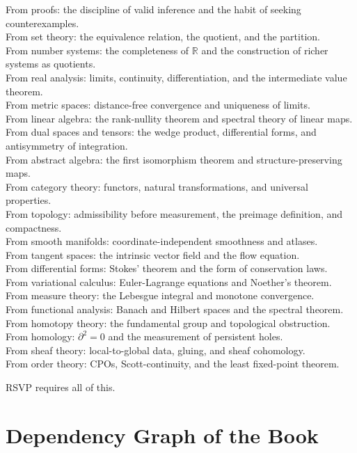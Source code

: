 \documentclass[12pt, twoside, openright, a4paper]{book}
\newcommand{\R}{\mathbb{R}}
\begin{document}
\noindent From proofs: the discipline of valid inference and the habit of seeking counterexamples.\\
From set theory: the equivalence relation, the quotient, and the partition.\\
From number systems: the completeness of $\R$ and the construction of richer systems as quotients.\\
From real analysis: limits, continuity, differentiation, and the intermediate value theorem.\\
From metric spaces: distance-free convergence and uniqueness of limits.\\
From linear algebra: the rank-nullity theorem and spectral theory of linear maps.\\
From dual spaces and tensors: the wedge product, differential forms, and antisymmetry of integration.\\
From abstract algebra: the first isomorphism theorem and structure-preserving maps.\\
From category theory: functors, natural transformations, and universal properties.\\
From topology: admissibility before measurement, the preimage definition, and compactness.\\
From smooth manifolds: coordinate-independent smoothness and atlases.\\
From tangent spaces: the intrinsic vector field and the flow equation.\\
From differential forms: Stokes' theorem and the form of conservation laws.\\
From variational calculus: Euler-Lagrange equations and Noether's theorem.\\
From measure theory: the Lebesgue integral and monotone convergence.\\
From functional analysis: Banach and Hilbert spaces and the spectral theorem.\\
From homotopy theory: the fundamental group and topological obstruction.\\
From homology: $\partial^2 = 0$ and the measurement of persistent holes.\\
From sheaf theory: local-to-global data, gluing, and sheaf cohomology.\\
From order theory: CPOs, Scott-continuity, and the least fixed-point theorem.

RSVP requires all of this.


\section{Dependency Graph of the Book}
\end{document}
